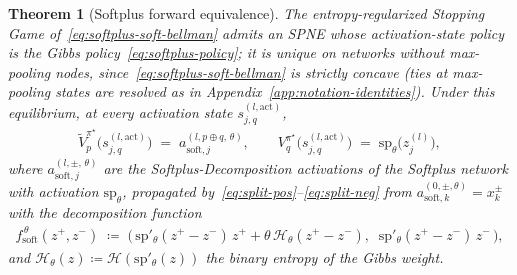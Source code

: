 \documentclass[twoside]{article}
\newcommand{\1}{\mathbf{1}}
\newtheorem{theorem}{Theorem}
\begin{document}
\begin{theorem}[Softplus forward equivalence]\label{thm:softplus-forward}
The entropy-regularized Stopping Game of~\eqref{eq:softplus-soft-bellman} admits an SPNE whose
activation-state policy is the Gibbs policy~\eqref{eq:softplus-policy}; it is unique on networks
without max-pooling nodes, since~\eqref{eq:softplus-soft-bellman} is strictly concave (ties at
max-pooling states are resolved as in Appendix~\ref{app:notation-identities}). Under this
equilibrium, at every activation state $s_{j,q}^{(l, \mathrm{act})}$,
\begin{align}\label{eq:softplus-spne-tildes}
    \tilde V_p^{\pi^\star}\!\bigl(s_{j,q}^{(l, \mathrm{act})}\bigr)
    \;=\;
    a_{\mathrm{soft},j}^{(l, p \oplus q,\,\theta)},
    \qquad
    V_q^{\pi^\star}\!\bigl(s_{j,q}^{(l, \mathrm{act})}\bigr)
    \;=\;
    \mathrm{sp}_\theta\!\bigl(z_j^{(l)}\bigr),
\end{align}
where $a_{\mathrm{soft},j}^{(l, \pm,\,\theta)}$ are the Softplus-Decomposition activations of the
Softplus network with activation $\mathrm{sp}_\theta$, propagated
by~\eqref{eq:split-pos}--\eqref{eq:split-neg} from $a_{\mathrm{soft},k}^{(0,\pm,\theta)} = x_k^\pm$
with the decomposition function
\begin{align}\label{eq:softplus-decomp}
    f_{\mathrm{soft}}^{\,\theta}(z^+, z^-) \;\coloneqq\; \bigl(\,\mathrm{sp}'_\theta(z^+ - z^-)\, z^+ +
    \theta\, \mathcal{H}_\theta(z^+ - z^-),\;\; \mathrm{sp}'_\theta(z^+ - z^-)\, z^-\,\bigr),
\end{align}
and $\mathcal{H}_\theta(z) \coloneqq \mathcal{H}(\mathrm{sp}'_\theta(z))$ the binary entropy of the
Gibbs weight.
\end{theorem}
\end{document}
